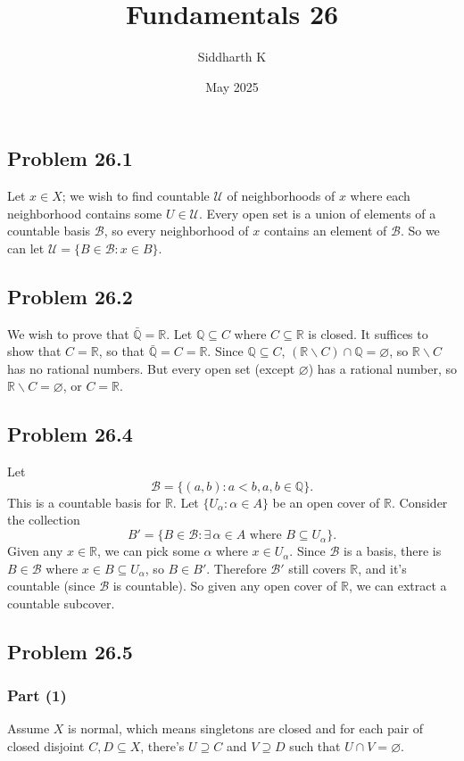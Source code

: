 \documentclass{article}
\title{Fundamentals 26}
\author{Siddharth K}
\date{May 2025}
\newcommand{\R}{\mathbb{R}}
\newcommand{\Q}{\mathbb{Q}}
\newcommand{\B}{\mathcal{B}}
\newcommand{\U}{\mathcal{U}}
\newcommand{\nullset}{\varnothing}
\newcommand{\minus}{\backslash}
\begin{document}
\maketitle

\subsection*{Problem 26.1}
Let $x \in X$; we wish to find countable $\U$ of neighborhoods of $x$ where each neighborhood contains some $U \in \U$. Every open set is a union of elements of a countable basis $\B$, so every neighborhood of $x$ contains an element of $\B$. So we can let $\U = \{B \in \B : x \in B\}$.

\subsection*{Problem 26.2}
We wish to prove that $\bar{\Q} = \R$. Let $\Q \subseteq C$ where $C \subseteq \R$ is closed. It suffices to show that $C = \R$, so that $\bar{\Q} = C = \R$. Since $\Q \subseteq C$, $(\R \minus C) \cap \Q = \nullset$, so $\R \minus C$ has no rational numbers. But every open set (except $\nullset$) has a rational number, so $\R \minus C = \nullset$, or $C = \R$.

\subsection*{Problem 26.4}
Let
$$\B = \{(a, b): a < b, a, b \in \Q\}.$$
This is a countable basis for $\R$. Let $\{U_\alpha : \alpha \in A\}$ be an open cover of $\R$. Consider the collection
$$B' = \{B \in \B: \exists\,\alpha \in A \text{ where } B \subseteq U_\alpha\}.$$
Given any $x \in \R$, we can pick some $\alpha$ where $x \in U_\alpha$. Since $\B$ is a basis, there is $B \in \B$ where $x \in B \subseteq U_\alpha$, so $B \in B'$. Therefore $\B'$ still covers $\R$, and it's countable (since $\B$ is countable). So given any open cover of $\R$, we can extract a countable subcover.

\subsection*{Problem 26.5}
\subsubsection*{Part (1)}
Assume $X$ is normal, which means singletons are closed and for each pair of closed disjoint $C, D \subseteq X$, there's $U \supseteq C$ and $V \supseteq D$ such that $U \cap V = \nullset$. \\
\end{document}
